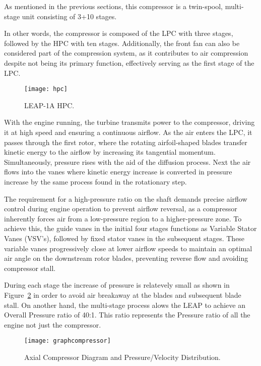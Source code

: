 As mentioned in the previous sections, this compressor is a twin-spool, multi-stage unit consisting of 3+10 stages.

In other words, the compressor is composed of the \gls{LPC} with three stages, followed by the \gls{HPC} with ten stages. Additionally, the front fan can also be considered part of the compression system, as it contributes to air compression despite not being its primary function, effectively serving as the first stage of the \gls{LPC}.

\begin{figure}[H]
    \centering
    \texttt{[image: hpc]}
    \caption{LEAP-1A HPC.\cite{ESM}}
    \label{fig:hpc}
\end{figure}


With the engine running, the turbine transmits power to the compressor, driving it at high speed and ensuring a continuous airflow. As the air enters the \gls{LPC}, it passes through the first rotor, where the rotating airfoil-shaped blades transfer kinetic energy to the airflow by increasing its tangential momentum. Simultaneously, pressure rises with the aid of the diffusion process.
Next the air flows into the vanes  where kinetic energy increase is converted in pressure increase by the same process found in the rotationary step. 

The requirement for a high-pressure ratio on the shaft demands precise airflow control during engine operation to prevent airflow reversal, as a compressor inherently forces air from a low-pressure region to a higher-pressure zone. To achieve this, the guide vanes in the initial four stages functions as Variable Stator Vanes (VSV's), followed by fixed stator vanes in the subsequent stages. These variable vanes progressively close at lower airflow speeds to maintain an optimal air angle on the downstream rotor blades, preventing reverse flow and avoiding compressor stall.

During each stage the increase of pressure is relatevely small as shown in Figure~\ref{fig:graphcompressor} in order to avoid air breakaway at the blades and subsequent blade stall. On another hand, the multi-stage process alows the \gls{LEAP} to achieve an Overall Pressure ratio of 40:1. This ratio represents the Pressure ratio of all the engine not just the compressor. 

\begin{figure}[H]
    \centering
    \texttt{[image: graphcompressor]}
    \caption{Axial Compressor Diagram and Pressure/Velocity Distribution.\cite{RollsRoyce}}
    \label{fig:graphcompressor}
\end{figure}

